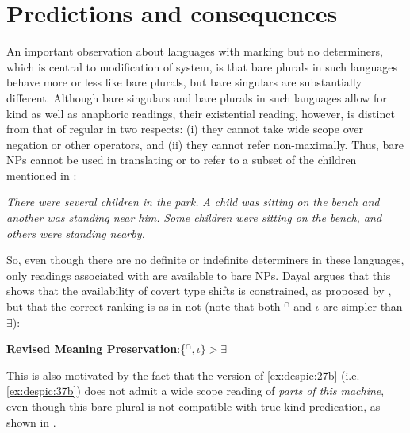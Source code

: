\documentclass[output=paper,
modfonts
]{langscibook}
\begin{document}
	\section{Predictions and consequences}  \label{sec:despic:4} 
	
	An important observation about languages with  marking but no determiners, which is
	central to  modification of  system, is that bare plurals in such languages behave more or less like  bare plurals, but bare singulars are substantially different. Although bare singulars and bare plurals in such languages allow for kind as well as anaphoric readings, their existential reading, however, is distinct from that of regular 
	in two respects: (i) they cannot take wide scope over negation or other operators, and (ii) they cannot refer non-maximally. Thus, bare NPs cannot be used in translating  or  to refer
	to a subset of the children mentioned in  \citep[1100]{Dayal2011}:
	
	\ea \label{ex:despic:35}
	\ea \label{ex:despic:35a}
	\textit{There were several children in the park.}
	\ex \label{ex:despic:35b}
	\textit{A child was sitting on the bench and another was standing near him.}
	\ex \label{ex:despic:35c}
	\textit{Some children were sitting on the bench, and others were standing nearby.} 
	\z 
	\z 
	
	So, even though there are no definite or indefinite determiners in these languages, only readings associated with  are available to bare NPs. Dayal argues that this shows that the availability of covert type shifts is constrained, as proposed by \citet{Chierchia1998}, but that the correct ranking is as in  not  (note that both $^\cap$ and $\iota$ are simpler than $\exists$):
	
	\ea \label{ex:despic:36}
	\textbf{Revised Meaning Preservation}:\hfill\{$^\cap,\iota\}>\exists$ \citep[219]{Dayal2004} 
	\z 
	
	This is also motivated by the fact that the  version of \ref{ex:despic:27b} (i.e. \ref{ex:despic:37b}) does not admit a
	wide scope reading of \textit{parts of this machine}, even though this bare plural is not compatible with true kind predication, as shown in .
	
\end{document}

